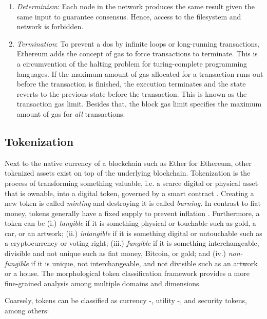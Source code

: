 \begin{enumerate}
    \item \emph{Determinism}: Each node in the network produces the same result given the same input to guarantee consensus. Hence, access to the filesystem and network is forbidden.
    \item \emph{Termination}: To prevent a \acrfull{dos} by infinite loops or long-running transactions, Ethereum adds the concept of gas to force transactions to terminate. This is a circumvention of the halting problem for turing-complete programming languages. If the maximum amount of gas allocated for a transaction runs out before the transaction is finished, the execution terminates and the state reverts to the previous state before the transaction. This is known as the transaction gas limit. Besides that, the block gas limit specifies the maximum amount of gas for \emph{all} transactions.
\end{enumerate}

\subsection{Tokenization}
\label{subsec:tokenization}

Next to the native currency of a blockchain such as Ether for Ethereum, other tokenized assets exist on top of the underlying blockchain. Tokenization is the process of transforming something valuable, i.e. a scarce digital or physical asset that is ownable, into a digital token, governed by a smart contract \cite{chenBlockchainTokensPotential2018}. Creating a new token is called \emph{minting} and destroying it is called \emph{burning}. In contrast to fiat money, tokens generally have a fixed supply to prevent inflation \cite{chenBlockchainTokensPotential2018}. Furthermore, a token can be (i.) \emph{tangible} if it is something physical or touchable such as gold, a car, or an artwork; (ii.) \emph{intangible} if it is something digital or untouchable such as a cryptocurrency or voting right; (iii.) \emph{fungible} if it is something interchangeable, divisible and not
unique such as fiat money, Bitcoin, or gold; and (iv.) \emph{non-fungible} if it is unique, not interchangeable, and not divisible such as an artwork or a house. The morphological token classification framework \cite{freniTokenomicsBlockchainTokens2022} provides a more fine-grained analysis among multiple domains and dimensions.

Coarsely, tokens can be classified as currency -, utility -, and security tokens, among others:

